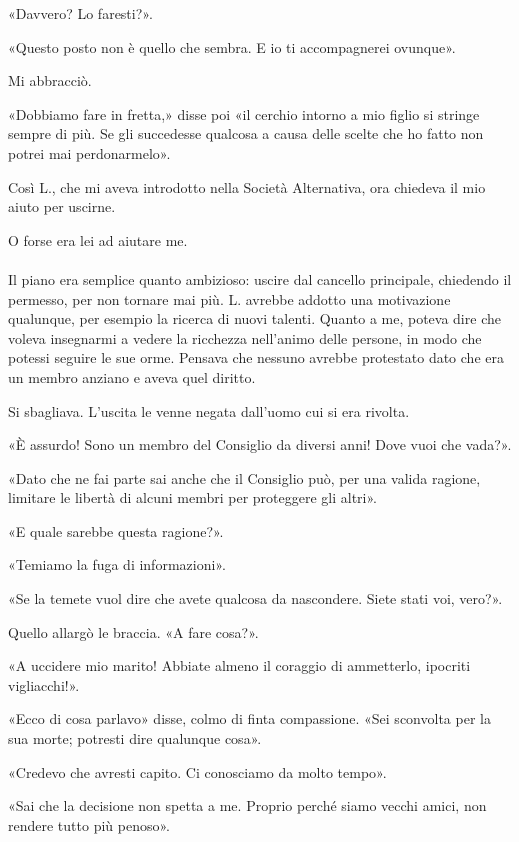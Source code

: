 \documentclass[a4paper,12pt]{book}
\begin{document}
«Davvero? Lo faresti?».

«Questo posto non è quello che sembra. E io ti accompagnerei ovunque».

Mi abbracciò.

«Dobbiamo fare in fretta,» disse poi «il cerchio intorno a mio figlio si stringe
sempre di più. Se gli succedesse qualcosa a causa delle scelte che ho fatto non
potrei mai perdonarmelo».

Così L., che mi aveva introdotto nella Società Alternativa, ora chiedeva il mio
aiuto per uscirne.

O forse era lei ad aiutare me.

\paragraph{}
Il piano era semplice quanto ambizioso: uscire dal cancello principale,
chiedendo il permesso, per non tornare mai più. L. avrebbe addotto una
motivazione qualunque, per esempio la ricerca di nuovi talenti. Quanto a me,
poteva dire che voleva insegnarmi a vedere la ricchezza nell'animo delle
persone, in modo che potessi seguire le sue orme. Pensava che nessuno avrebbe
protestato dato che era un membro anziano e aveva quel diritto.

Si sbagliava. L'uscita le venne negata dall'uomo cui si era rivolta.

«È assurdo! Sono un membro del Consiglio da diversi anni! Dove vuoi che vada?».

«Dato che ne fai parte sai anche che il Consiglio può, per una valida ragione,
limitare le libertà di alcuni membri per proteggere gli altri».

«E quale sarebbe questa ragione?».

«Temiamo la fuga di informazioni».

«Se la temete vuol dire che avete qualcosa da nascondere. Siete stati voi,
vero?».

Quello allargò le braccia. «A fare cosa?».

«A uccidere mio marito! Abbiate almeno il coraggio di ammetterlo, ipocriti
vigliacchi!».

«Ecco di cosa parlavo» disse, colmo di finta compassione. «Sei sconvolta per la
sua morte; potresti dire qualunque cosa».

«Credevo che avresti capito. Ci conosciamo da molto tempo».

«Sai che la decisione non spetta a me. Proprio perché siamo vecchi amici, non
rendere tutto più penoso».
\end{document}
